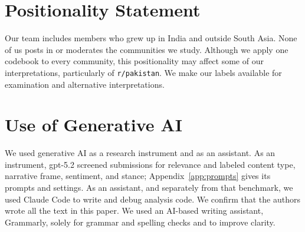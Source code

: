 

\section*{Positionality Statement}

Our team includes members who grew up in India and outside South Asia. None of us posts in or moderates the communities we study. Although we apply one codebook to every community, this positionality may affect some of our interpretations, particularly of \texttt{r/pakistan}. We make our labels available for examination and alternative interpretations.


\section*{Use of Generative AI}
We used generative AI as a research instrument and as an assistant. As an instrument, gpt-5.2 screened submissions for relevance and labeled content type, narrative frame, sentiment, and stance; Appendix~\ref{app:prompts} gives its prompts and settings. As an assistant, and separately from that benchmark, we used Claude Code to write and debug analysis code. We confirm that the authors wrote all the text in this paper. We used an AI-based writing assistant, Grammarly, solely for grammar and spelling checks and to improve clarity. 
